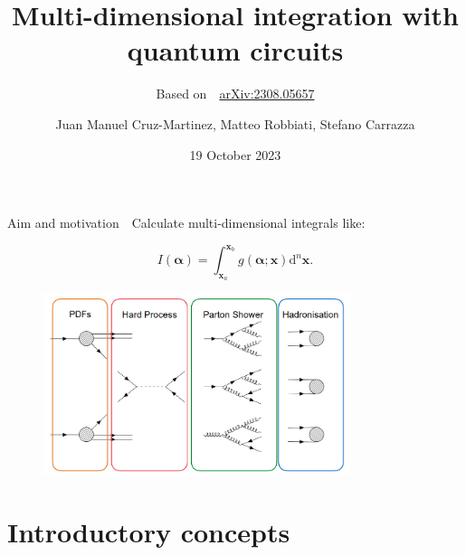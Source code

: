 \documentclass[8pt, xcolor={svgnames}, hyperref={linkcolor=black}]{beamer}
\title{Multi-dimensional integration with quantum circuits}
\subtitle{Based on \faBook\,\, \href{https://arxiv.org/abs/2308.05657}{	arXiv:2308.05657}}
\date{19 October 2023}
\author[Juan Manuel Cruz-Martinez, Matteo Robbiati, Stefano Carrazza]{Juan Manuel Cruz-Martinez, Matteo Robbiati, Stefano Carrazza}
\begin{document}
\maketitle

\begin{frame}{Aim and motivation}
\faCrosshairs\,\, Calculate multi-dimensional integrals like:

\begin{equation}
I(\bm{\alpha}) = \int_{\bm{x}_a}^{\bm{x}_b} g(\bm{\alpha}; \bm{x}) \text{d}^n \bm{x}.
\label{eq:integral}
\end{equation}
\pause
\begin{figure}  
    \includegraphics[width=0.8\textwidth]{figures/motivation.png}
\end{figure}
\end{frame}

\section{Introductory concepts}
\end{document}
